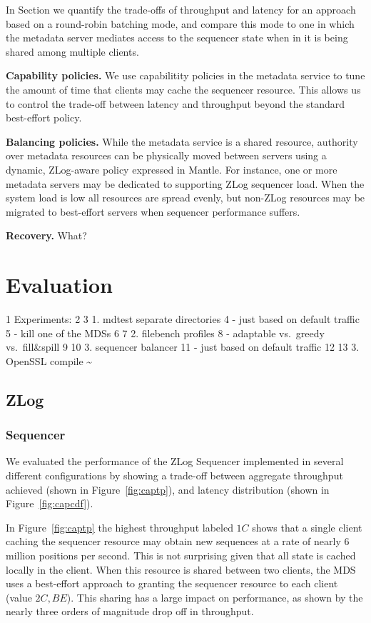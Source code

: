 \documentclass[10pt,twocolumn]{article}
\begin{document}
In Section we quantify the trade-offs of throughput and latency for an
approach based on a round-robin batching mode, and compare this mode to one in
which the metadata server mediates access to the sequencer state when in it is
being shared among multiple clients.

{\bf Capability policies.}
We use capabilitity policies in the metadata service to tune the amount of
time that clients may cache the sequencer resource. This allows us to control
the trade-off between latency and throughput beyond the standard best-effort
policy.

{\bf Balancing policies.}
While the metadata service is a shared resource, authority over metadata
resources can be physically moved between servers using a dynamic, ZLog-aware
policy expressed in Mantle. For instance, one or more metadata servers may be
dedicated to supporting ZLog sequencer load. When the system load is low all
resources are spread evenly, but non-ZLog resources may be migrated to
best-effort servers when sequencer performance suffers.

{\bf Recovery.}
What?

\section{Evaluation}\label{evaluation}

1 Experiments: 2 3 1. mdtest separate directories 4 - just based on
default traffic 5 - kill one of the MDSs 6 7 2. filebench profiles 8 -
adaptable vs.~greedy vs.~fill\&spill 9 10 3. sequencer balancer 11 -
just based on default traffic 12 13 3. OpenSSL compile
\textasciitilde{}\\\label{evaluation}

\subsection{ZLog}

\subsubsection{Sequencer}

We evaluated the performance of the ZLog Sequencer implemented in several
different configurations by showing a trade-off between aggregate throughput
achieved (shown in Figure~\ref{fig:captp}), and latency distribution (shown in
Figure~\ref{fig:capcdf}).

In Figure~\ref{fig:captp} the highest throughput labeled $1C$ shows that a
single client caching the sequencer resource may obtain new sequences at a rate
of nearly 6 million positions per second. This is not surprising given that all
state is cached locally in the client. When this resource is shared between two
clients, the MDS uses a best-effort approach to granting the sequencer resource
to each client (value $2C,BE$). This sharing has a large impact on performance,
as shown by the nearly three orders of magnitude drop off in throughput.
\end{document}
